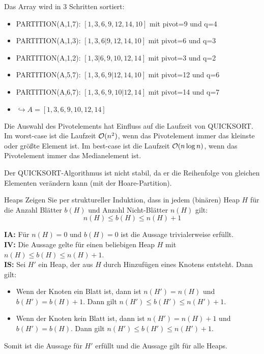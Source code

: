 \documentclass{exercisesheet}
\begin{document}
\begin{solutions}
  \item Das Array wird in 3 Schritten sortiert:
  \begin{itemize}
    \item PARTITION(A,1,7): $[1,3,6,9,12,14,10]$ mit pivot=9 und q=4
    \item PARTITION(A,1,3): $[1,3,6|9,12,14,10]$ mit pivot=6 und q=3
    \item PARTITION(A,1,2): $[1,3|6,9,10,12,14]$ mit pivot=3 und q=2
    \item PARTITION(A,5,7): $[1,3,6,9|12,14,10]$ mit pivot=12 und q=6
    \item PARTITION(A,6,7): $[1,3,6,9,10|12,14]$ mit pivot=14 und q=7
    \item[] $\hookrightarrow A = [1,3,6,9,10,12,14]$
  \end{itemize}
  \item Die Auswahl des Pivotelements hat Einfluss auf die Laufzeit von QUICKSORT. Im worst-case ist die Laufzeit $\mathcal{O}(n^2)$, wenn das Pivotelement immer das kleinste oder größte Element ist. Im best-case ist die Laufzeit $\mathcal{O}(n \log n)$, wenn das Pivotelement immer das Medianelement ist.
  \item Der QUICKSORT-Algorithmus ist nicht stabil, da er die Reihenfolge von gleichen Elementen verändern kann (mit der Hoare-Partition).
\end{solutions}

\begin{exercise}{Heaps}
  Zeigen Sie per struktureller Induktion, dass in jedem (binären) Heap $H$ für die Anzahl Blätter $b(H)$ und Anzahl Nicht-Blätter $n(H)$ gilt:
  \begin{equation*}
    n(H) \leq b(H) \leq n(H)+1
  \end{equation*}

  \begin{solution}
    \textbf{IA:} Für $n(H) = 0$ und $b(H) = 0$ ist die Aussage trivialerweise erfüllt. \\
    \textbf{IV:} Die Aussage gelte für einen beliebigen Heap $H$ mit $n(H) \leq b(H) \leq n(H)+1$. \\
    \textbf{IS:} Sei $H'$ ein Heap, der aus $H$ durch Hinzufügen eines Knotens entsteht. Dann gilt:
    \begin{itemize}
      \item Wenn der Knoten ein Blatt ist, dann ist $n(H') = n(H)$ und $b(H') = b(H)+1$. Dann gilt $n(H') \leq b(H') \leq n(H')+1$.
      \item Wenn der Knoten kein Blatt ist, dann ist $n(H') = n(H)+1$ und $b(H') = b(H)$. Dann gilt $n(H') \leq b(H') \leq n(H')+1$.
    \end{itemize}
    Somit ist die Aussage für $H'$ erfüllt und die Aussage gilt für alle Heaps.
  \end{solution}
\end{exercise}
\end{document}
